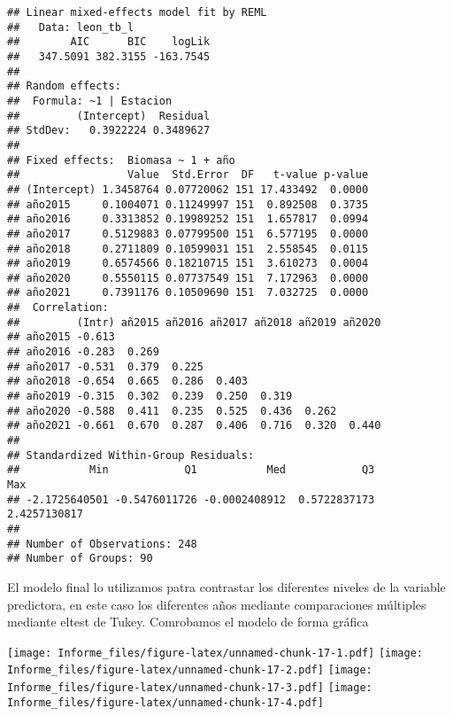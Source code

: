 \documentclass[
]{article}
\begin{document}
\begin{verbatim}
## Linear mixed-effects model fit by REML
##   Data: leon_tb_l 
##        AIC      BIC    logLik
##   347.5091 382.3155 -163.7545
## 
## Random effects:
##  Formula: ~1 | Estacion
##         (Intercept)  Residual
## StdDev:   0.3922224 0.3489627
## 
## Fixed effects:  Biomasa ~ 1 + año 
##                 Value  Std.Error  DF   t-value p-value
## (Intercept) 1.3458764 0.07720062 151 17.433492  0.0000
## año2015     0.1004071 0.11249997 151  0.892508  0.3735
## año2016     0.3313852 0.19989252 151  1.657817  0.0994
## año2017     0.5129883 0.07799500 151  6.577195  0.0000
## año2018     0.2711809 0.10599031 151  2.558545  0.0115
## año2019     0.6574566 0.18210715 151  3.610273  0.0004
## año2020     0.5550115 0.07737549 151  7.172963  0.0000
## año2021     0.7391176 0.10509690 151  7.032725  0.0000
##  Correlation: 
##         (Intr) añ2015 añ2016 añ2017 añ2018 añ2019 añ2020
## año2015 -0.613                                          
## año2016 -0.283  0.269                                   
## año2017 -0.531  0.379  0.225                            
## año2018 -0.654  0.665  0.286  0.403                     
## año2019 -0.315  0.302  0.239  0.250  0.319              
## año2020 -0.588  0.411  0.235  0.525  0.436  0.262       
## año2021 -0.661  0.670  0.287  0.406  0.716  0.320  0.440
## 
## Standardized Within-Group Residuals:
##           Min            Q1           Med            Q3           Max 
## -2.1725640501 -0.5476011726 -0.0002408912  0.5722837173  2.4257130817 
## 
## Number of Observations: 248
## Number of Groups: 90
\end{verbatim}

El modelo final lo utilizamos patra contrastar los diferentes niveles de
la variable predictora, en este caso los diferentes años mediante
comparaciones múltiples mediante eltest de Tukey. Comrobamos el modelo
de forma gráfica

\texttt{[image: Informe\_files/figure-latex/unnamed-chunk-17-1.pdf]}
\texttt{[image: Informe\_files/figure-latex/unnamed-chunk-17-2.pdf]}
\texttt{[image: Informe\_files/figure-latex/unnamed-chunk-17-3.pdf]}
\texttt{[image: Informe\_files/figure-latex/unnamed-chunk-17-4.pdf]}
\end{document}
